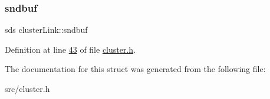\subsubsection{\texorpdfstring{sndbuf}{sndbuf}}
{\footnotesize\ttfamily sds cluster\+Link\+::sndbuf}



Definition at line \hyperlink{cluster_8h_source_l00043}{43} of file \hyperlink{cluster_8h_source}{cluster.\+h}.



The documentation for this struct was generated from the following file\+:\begin{DoxyCompactItemize}
\item 
src/cluster.\+h\end{DoxyCompactItemize}
